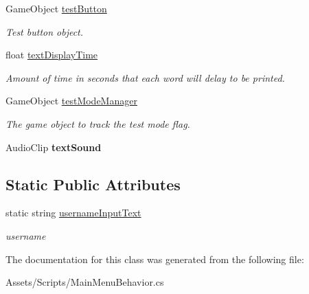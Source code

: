 \begin{DoxyCompactItemize}
\mbox{\label{class_main_menu_behavior_ae2251a7587081d43d0063209576dbaff}} 
Game\+Object \mbox{\hyperlink{class_main_menu_behavior_ae2251a7587081d43d0063209576dbaff}{test\+Button}}
\begin{DoxyCompactList}\small\item\em Test button object. \end{DoxyCompactList}\item 
\mbox{\label{class_main_menu_behavior_a688f08080926ec32f324c21da75a7771}} 
float \mbox{\hyperlink{class_main_menu_behavior_a688f08080926ec32f324c21da75a7771}{text\+Display\+Time}}
\begin{DoxyCompactList}\small\item\em Amount of time in seconds that each word will delay to be printed. \end{DoxyCompactList}\item 
\mbox{\label{class_main_menu_behavior_aad4443484303f9fc85e36843c7ac986c}} 
Game\+Object \mbox{\hyperlink{class_main_menu_behavior_aad4443484303f9fc85e36843c7ac986c}{test\+Mode\+Manager}}
\begin{DoxyCompactList}\small\item\em The game object to track the test mode flag. \end{DoxyCompactList}\item 
\mbox{\label{class_main_menu_behavior_ac27a647f3d33f8f028673a5f3dfff869}} 
Audio\+Clip {\bfseries text\+Sound}
\end{DoxyCompactItemize}
\subsection*{Static Public Attributes}
\begin{DoxyCompactItemize}
\item 
\mbox{\label{class_main_menu_behavior_a73338f524bbbf5b8637e12dd911a04f5}} 
static string \mbox{\hyperlink{class_main_menu_behavior_a73338f524bbbf5b8637e12dd911a04f5}{username\+Input\+Text}}
\begin{DoxyCompactList}\small\item\em username \end{DoxyCompactList}\end{DoxyCompactItemize}


The documentation for this class was generated from the following file\+:\begin{DoxyCompactItemize}
\item 
Assets/\+Scripts/Main\+Menu\+Behavior.\+cs\end{DoxyCompactItemize}

